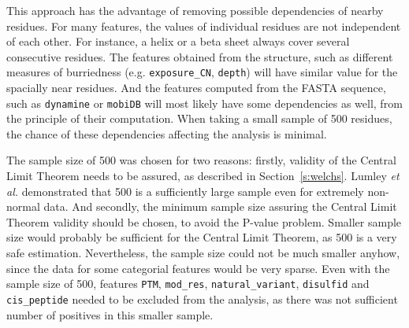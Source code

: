 This approach has the advantage of removing possible dependencies of nearby residues. For many features, the values of individual residues are not independent of each other. For instance, a helix or a beta sheet always cover several consecutive residues. The features obtained from the structure, such as different measures of burriedness (e.g. \texttt{exposure\_CN}, \texttt{depth}) will have similar value for the spacially near residues. And the features computed from the FASTA sequence, such as \texttt{dynamine} or \texttt{mobiDB} will most likely have some dependencies as well, from the principle of their computation. When taking a small sample of 500 residues, the chance of these dependencies affecting the analysis is minimal.

The sample size of 500 was chosen for two reasons: firstly, validity of the Central Limit Theorem needs to be assured, as described in Section~\ref{s:welchs}. Lumley \textit{et al.} \cite{lumley} demonstrated that 500 is a sufficiently large sample even for extremely non-normal data. And secondly, the minimum sample size assuring the Central Limit Theorem validity should be chosen, to avoid the P-value problem. Smaller sample size would probably be sufficient for the Central Limit Theorem, as 500 is a very safe estimation. Nevertheless, the sample size could not be much smaller anyhow, since the data for some categorial features would be very sparse. Even with the sample size of 500, features \texttt{PTM}, \texttt{mod\_res}, \texttt{natural\_variant}, \texttt{disulfid} and \texttt{cis\_peptide} needed to be excluded from the analysis, as there was not sufficient number of positives in this smaller sample.


